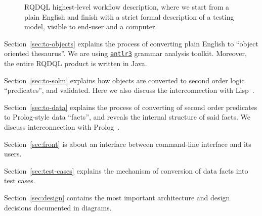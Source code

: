 \documentclass{article}
\begin{document}
    \begin{figure}[ht]
        \caption{RQDQL highest-level workflow description, where we start
            from a plain English and finish with a strict formal description
            of a testing model, visible to end-user and a computer.}
        \label{fig:Workflow}
    \end{figure}

    Section~\ref{sec:to-objects} explains the process of converting plain English
    to ``object oriented thesaurus''. We are using
    \href{http://www.altlr.org}{\texttt{antlr3}} grammar analysis toolkit.
    Moreover, the entire RQDQL product is written in Java.

    Section~\ref{sec:to-solm} explains how objects are converted to
    second order logic ``predicates'',
    and validated. Here we also discuss the interconnection with
    Lisp~\cite{graham93}.

    Section~\ref{sec:to-data} explains the process of converting of
    second order predicates to Prolog-style data ``facts'', and reveals the internal
    structure of said facts. We discuss interconnection with Prolog~\cite{shapiro94}.

    Section~\ref{sec:front} is about an interface between 
    command-line interface and its users.

    Section~\ref{sec:test-cases} explains the mechanism of conversion
    of data facts into test cases.

    Section~\ref{sec:design} contains the most important architecture
    and design decisions documented in diagrams.
\end{document}
